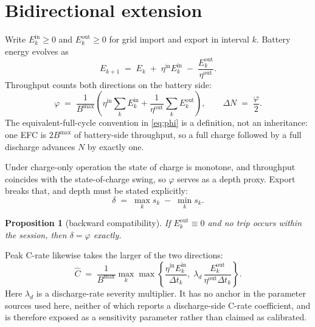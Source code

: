\documentclass[11pt,a4paper]{article}
\newtheorem{proposition}{Proposition}
\newcommand{\Bmax}{B^{\max}}
\newcommand{\etain}{\eta^{\mathrm{in}}}
\newcommand{\etaout}{\eta^{\mathrm{out}}}
\begin{document}
\section{Bidirectional extension}
\label{sec:v2g}

Write $E^{\mathrm{in}}_k \ge 0$ and $E^{\mathrm{out}}_k \ge 0$ for grid
import and export in interval $k$. Battery energy evolves as
%
\begin{equation}
E_{k+1} \;=\; E_k \;+\; \etain E^{\mathrm{in}}_k
  \;-\; \frac{E^{\mathrm{out}}_k}{\etaout}.
\label{eq:state}
\end{equation}
%
Throughput counts both directions on the battery side:
%
\begin{equation}
\varphi \;=\; \frac{1}{\Bmax}
  \left( \etain \sum_{k} E^{\mathrm{in}}_k
       + \frac{1}{\etaout}\sum_{k} E^{\mathrm{out}}_k \right),
\qquad
\Delta N \;=\; \frac{\varphi}{2}.
\label{eq:phi}
\end{equation}
%
The equivalent-full-cycle convention in \eqref{eq:phi} is a definition,
not an inheritance: one EFC is $2\Bmax$ of battery-side throughput, so a
full charge followed by a full discharge advances $N$ by exactly one.

Under charge-only operation the state of charge is monotone, and
throughput coincides with the state-of-charge swing, so $\varphi$ serves
as a depth proxy. Export breaks that, and depth must be stated
explicitly:
%
\begin{equation}
\delta \;=\; \max_{k} s_k \;-\; \min_{k} s_k .
\label{eq:delta}
\end{equation}
%
\begin{proposition}[backward compatibility]
If $E^{\mathrm{out}}_k \equiv 0$ and no trip occurs within the session,
then $\delta = \varphi$ exactly.
\end{proposition}
%
\noindent
Peak C-rate likewise takes the larger of the two directions:
%
\begin{equation}
\hat{C} \;=\; \frac{1}{\Bmax} \max_{k}
  \max\!\left\{
    \frac{\etain E^{\mathrm{in}}_k}{\Delta t_k},\;
    \lambda_d\,\frac{E^{\mathrm{out}}_k}{\etaout \Delta t_k}
  \right\}.
\label{eq:chat}
\end{equation}
%
Here $\lambda_d$ is a discharge-rate severity multiplier. It has no
anchor in the parameter sources used here, neither of which reports a
discharge-side C-rate coefficient, and is therefore exposed as a
sensitivity parameter rather than claimed as calibrated.
\end{document}
